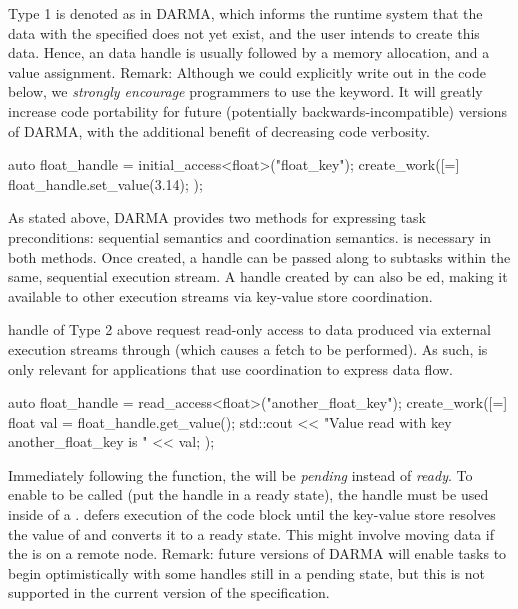Type 1 is denoted as  in \gls{DARMA}, 
which informs the \gls{runtime system} that the data with the 
specified  does not yet exist, and the user intends to 
create this data.%
Hence, an  data \gls{handle} is usually 
followed by a memory allocation, and a value assignment. 
Remark: Although we could explicitly write out \ahandleT in the code below,
we \emph{strongly encourage} programmers to use the \CC{}  keyword.
It will greatly increase code portability for future (potentially
backwards-incompatible) versions of \gls{DARMA},
with the additional benefit of decreasing code verbosity.

\begin{CppCode}
auto float_handle = initial_access<float>("float_key");
create_work([=]{
  float_handle.set_value(3.14);
});
\end{CppCode}
As stated above, \gls{DARMA} provides two methods for expressing \gls{task}
\glspl{precondition}: \gls{sequential semantics} and \gls{coordination
semantics}.   is necessary in both methods.
Once created, a \gls{handle} can be passed along to \glspl{subtask} within the same,
sequential \gls{execution stream}.
A \gls{handle} created by  can also be ed,
making it available to other \glspl{execution stream} via \gls{key-value store} coordination.

\Gls{handle} of Type 2 above request read-only access to data produced via
external \glspl{execution stream} through  (which causes
a \gls{fetch} to be performed). 
As such,  is only relevant for applications that use coordination to express data flow.
\begin{CppCode}
auto float_handle = read_access<float>("another_float_key");
create_work([=]{
  float val = float_handle.get_value();
  std::cout << "Value read with key another_float_key is " << val;  
});
\end{CppCode}

Immediately following the  function, the \ahandle will be
\emph{\gls{pending}} instead of \emph{\gls{ready}}.
To enable  to be called (put the \gls{handle} in a
\gls{ready} state), the \gls{handle} must be used inside of a .
\cwork defers execution of the code block until the \gls{key-value store}
resolves the value of  and converts it to a
\gls{ready} state.  This might involve moving data if the  is on a remote node.
Remark: future versions of \gls{DARMA} will enable \glspl{task} to begin
optimistically with some \glspl{handle} still in a \gls{pending} state, but
this is not supported in the current version of the specification.

